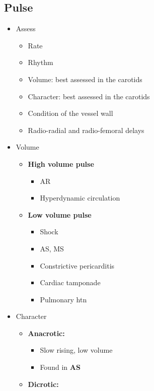 \documentclass[
  12pt,
]{memoir}
\providecommand{\tightlist}{%
  \setlength{\itemsep}{0pt}\setlength{\parskip}{0pt}}
\begin{document}
\hypertarget{pulse}{%
\subsection{Pulse}\label{pulse}}

\begin{itemize}
\tightlist
\item
  Assess

  \begin{itemize}
  \tightlist
  \item
    Rate
  \item
    Rhythm
  \item
    Volume: best assessed in the carotids
  \item
    Character: best assessed in the carotids
  \item
    Condition of the vessel wall
  \item
    Radio-radial and radio-femoral delays
  \end{itemize}
\item
  Volume

  \begin{itemize}
  \tightlist
  \item
    \textbf{High volume pulse}

    \begin{itemize}
    \tightlist
    \item
      AR
    \item
      Hyperdynamic circulation
    \end{itemize}
  \item
    \textbf{Low volume pulse}

    \begin{itemize}
    \tightlist
    \item
      Shock
    \item
      AS, MS
    \item
      Constrictive pericarditis
    \item
      Cardiac tamponade
    \item
      Pulmonary htn
    \end{itemize}
  \end{itemize}
\item
  Character

  \begin{itemize}
  \tightlist
  \item
    \textbf{Anacrotic:}

    \begin{itemize}
    \tightlist
    \item
      Slow rising, low volume
    \item
      Found in \textbf{AS}
    \end{itemize}
  \item
    \textbf{Dicrotic:}


\end{itemize}
\end{itemize}
\end{document}
